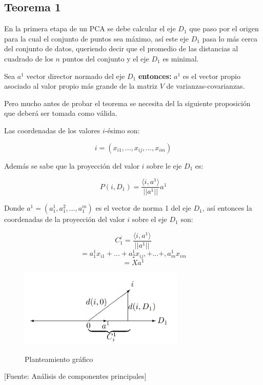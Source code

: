 \subsection{Teorema 1}

En la primera etapa de un PCA se debe calcular el eje $D_1$ que paso por el origen para la cual el conjunto de puntos sea máximo, así este eje $D_1$ pasa lo más cerca del conjunto de datos, queriendo decir que el promedio de las distancias al cuadrado de los $n$ puntos del conjunto y el eje $D_1$ es minimal.

Sea $a^1$  vector director normado del eje $D_1$ \textbf{entonces: } $a^1$ es el vector propio asociado al valor propio más grande de la matriz $V$ de varianzas-covarianzas.

Pero mucho antes de probar el teorema se necesita del la siguiente proposición que deberá ser tomada como válida.


Las coordenadas de los valores $i$-ésimo son:
 
 $$i=(x_{i1},...,x_{ij},...,x_{im})$$
 
 Además se sabe que la proyección del valor $i$ sobre le eje $D_1$ es:
 
 
 $$P(i,D_1)=\dfrac{\langle i, a^1 \rangle}{||a^1||}a^1$$
 
 Donde $a^1=(a_{1}^{1},a_{1}^{2},...,a_{1}^{m})$ es el vector de norma 1 del eje $D_1$, así entonces la coordenadas de la proyección del valor $i$ sobre el eje $D_1$ son:
 
 $$C_{1}^{i}=\dfrac{\langle i, a^1 \rangle}{||a^1||}$$
 $$=a_{1}^{1}x_{i1}+...+a_{2}^{1}x_{ij},+...+,a_{m}^{1}x_{im}$$
 $$=Xa^1$$
 
 \begin{figure}[H]
        \centering
        \caption{Planteamiento gráfico}
        \includegraphics[width=0.7\textwidth]{figures/grafico.JPG}
        \label{graficoPitagoras}
\end{figure}
\begin{center}
    [Fuente:  Análisis de componentes principales]\cite{rojas2009analisis}
\end{center}

